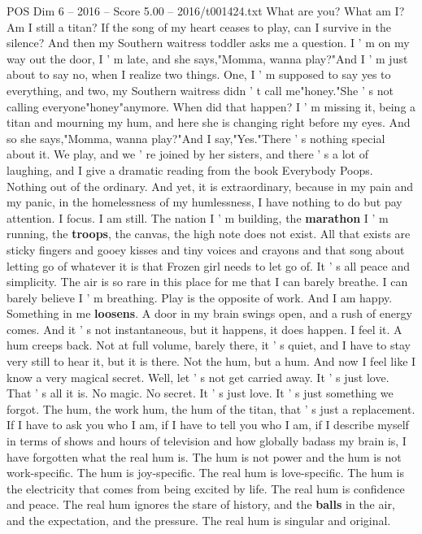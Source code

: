 \begin{textsample}{POS Dim 6 – 2016 – Score 5.00 – 2016/t001424.txt}
What are you?
What am I?
Am I still a titan?
If the song of my heart ceases to play, can I survive in the silence?
And then my Southern waitress toddler asks me a question.
I ' m on my way out the door, I ' m late, and she says,"Momma, wanna play?"And I ' m just about to say no, when I realize two things.
One, I ' m supposed to say yes to everything, and two, my Southern waitress didn ' t call me"honey."She ' s not calling everyone"honey"anymore.
When did that happen?
I ' m missing it, being a titan and mourning my hum, and here she is changing right before my eyes.
And so she says,"Momma, wanna play?"And I say,"Yes."There ' s nothing special about it.
We play, and we ' re joined by her sisters, and there ' s a lot of laughing, and I give a dramatic reading from the book Everybody Poops.
Nothing out of the ordinary.
And yet, it is extraordinary, because in my pain and my panic, in the homelessness of my humlessness, I have nothing to do but pay attention.
I focus.
I am still.
The nation I ' m building, the \textbf{marathon} I ' m running, the \textbf{troops}, the canvas, the high note does not exist.
All that exists are sticky fingers and gooey kisses and tiny voices and crayons and that song about letting go of whatever it is that Frozen girl needs to let go of.
It ' s all peace and simplicity.
The air is so rare in this place for me that I can barely breathe.
I can barely believe I ' m breathing.
Play is the opposite of work.
And I am happy.
Something in me \textbf{loosens}.
A door in my brain swings open, and a rush of energy comes.
And it ' s not instantaneous, but it happens, it does happen.
I feel it.
A hum creeps back.
Not at full volume, barely there, it ' s quiet, and I have to stay very still to hear it, but it is there.
Not the hum, but a hum.
And now I feel like I know a very magical secret.
Well, let ' s not get carried away.
It ' s just love.
That ' s all it is.
No magic.
No secret.
It ' s just love.
It ' s just something we forgot.
The hum, the work hum, the hum of the titan, that ' s just a replacement.
If I have to ask you who I am, if I have to tell you who I am, if I describe myself in terms of shows and hours of television and how globally badass my brain is, I have forgotten what the real hum is.
The hum is not power and the hum is not work-specific.
The hum is joy-specific.
The real hum is love-specific.
The hum is the electricity that comes from being excited by life.
The real hum is confidence and peace.
The real hum ignores the stare of history, and the \textbf{balls} in the air, and the expectation, and the pressure.
The real hum is singular and original.

\end{textsample}
